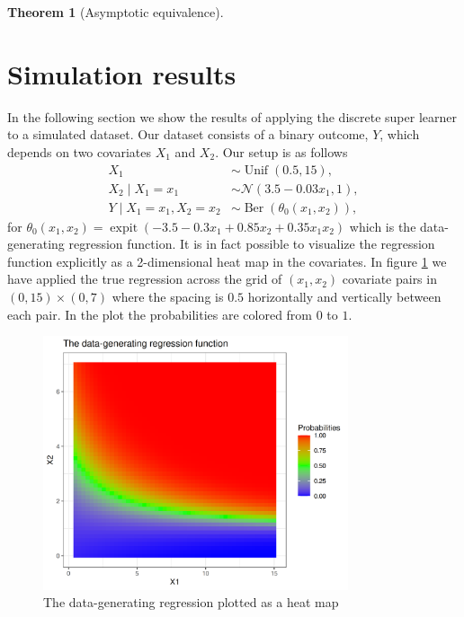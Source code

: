 \documentclass[11pt, a4paper]{article}
\newtheorem{theorem}{Theorem}
\theoremstyle{definition}
\theoremstyle{remark}
\DeclareMathOperator{\expit}{expit}
\begin{document}
\begin{theorem}[Asymptotic equivalence]
    
\end{theorem}



\section{Simulation results} \label{sec:simulations}
In the following section we show the results of applying the discrete super learner to a simulated dataset. Our dataset consists of a binary outcome, $Y$, which depends on two covariates $X_1$ and $X_2$. Our setup is as follows
\begin{align*}
    X_1 &\sim \operatorname{Unif}(0.5, 15),\\
    X_2 \mid X_1 = x_1 &\sim \mathcal{N}(3.5-0.03x_1, 1),\\
    Y \mid X_1 = x_1, X_2 = x_2 &\sim \operatorname{Ber}(\theta_0(x_1, x_2)),
\end{align*}
for $\theta_0(x_1, x_2) = \expit({-3.5 - 0.3x_1 + 0.85x_2 + 0.35x_1x_2})$ which is the data-generating regression function. It is in fact possible to visualize the regression function explicitly as a 2-dimensional heat map in the covariates. In figure \ref{fig:trueplot} we have applied the true regression across the grid of $ (x_1, x_2) $ covariate pairs in $ (0, 15) \times (0,7) $ where the spacing is $ 0.5 $ horizontally and vertically between each pair. In the plot the probabilities are colored from $ 0 $ to $ 1 $. 
\begin{figure}[H]
    \centering
    \includegraphics[width=0.8\textwidth]{figures/trueplot.png}
    \caption{The data-generating regression plotted as a heat map}
    \label{fig:trueplot}
\end{figure}
\end{document}
